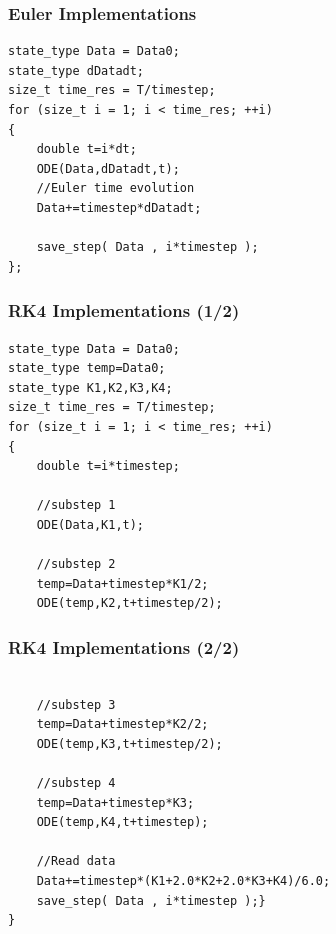 \documentclass{beamer}
\begin{document}
\begin{frame}[fragile]
\frametitle{Euler Implementations}
\begin{lstlisting}
state_type Data = Data0;
state_type dDatadt;
size_t time_res = T/timestep;
for (size_t i = 1; i < time_res; ++i)
{
    double t=i*dt;
    ODE(Data,dDatadt,t);
    //Euler time evolution
    Data+=timestep*dDatadt;

    save_step( Data , i*timestep );
};
\end{lstlisting}
\end{frame}

\begin{frame}[fragile]
\frametitle{RK4 Implementations (1/2)}
\begin{lstlisting}
state_type Data = Data0;
state_type temp=Data0;
state_type K1,K2,K3,K4;
size_t time_res = T/timestep;
for (size_t i = 1; i < time_res; ++i)
{
    double t=i*timestep;

    //substep 1
    ODE(Data,K1,t);

    //substep 2
    temp=Data+timestep*K1/2;
    ODE(temp,K2,t+timestep/2);
\end{lstlisting}
\end{frame}

\begin{frame}[fragile]
\frametitle{RK4 Implementations (2/2)}
\begin{lstlisting}

    //substep 3
    temp=Data+timestep*K2/2;
    ODE(temp,K3,t+timestep/2);

    //substep 4
    temp=Data+timestep*K3;
    ODE(temp,K4,t+timestep);

    //Read data
    Data+=timestep*(K1+2.0*K2+2.0*K3+K4)/6.0;
    save_step( Data , i*timestep );}
}
\end{lstlisting}
\end{frame}


\end{document}
